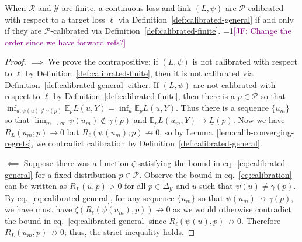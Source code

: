 \documentclass[anon,12pt]{colt2021} %
\newcommand{\Comments}{1}
\newcommand{\mynote}[2]{\ifnum\Comments=1\textcolor{#1}{#2}\fi}
\newcommand{\mytodo}[2]{\ifnum\Comments=1%
	\todo[linecolor=#1!80!black,backgroundcolor=#1,bordercolor=#1!80!black]{#2}\fi}
\newcommand{\jessie}[1]{\mynote{purple}{[JF: #1]}}
\newcommand{\btw}[1]{\mytodo{orange!80!white}{BTW: #1}}
\newcommand{\simplex}{\Delta_\Y}
\newcommand{\E}{\mathbb{E}}
\newcommand{\R}{\mathcal{R}}
\renewcommand{\P}{\mathcal{P}}
\newcommand{\Y}{\mathcal{Y}}
\newcommand{\exploss}[3]{\E_{#3} #1(#2,Y)}
\newcommand{\risk}[1]{\underline{#1}}
\begin{document}
\begin{proposition}
	When $\R$ and $\Y$ are finite, a continuous loss and link $(L, \psi)$ are $\P$-calibrated with respect to a target loss $\ell$ via Definition~\ref{def:calibrated-general} if and only if they are $\P$-calibrated via Definition~\ref{def:calibrated-finite}.
	\jessie{Change the order since we have forward refs?}
\end{proposition}
\begin{proof}
$\implies$
	We prove the contrapositive; if $(L, \psi)$ is not calibrated with respect to $\ell$ by Definition~\ref{def:calibrated-finite}, then it is not calibrated via Definition~\ref{def:calibrated-general} either.
	If $(L, \psi)$ are not calibrated with respect to $\ell$ by Definition~\ref{def:calibrated-finite}, then there is a $p \in \P$ so that $\inf_{u : \psi(u) \not \in \gamma(p)} \exploss{L}{u}{p} = \inf_u \exploss{L}{u}{p}$.
	Thus there is a sequence $\{u_m\}$ so that $\lim_{m \to \infty} \psi(u_m) \not \in \gamma(p)$ and $\exploss{L}{u_m}{p} \to \risk{L}(p)$.  
	Now we have $R_L(u_m; p) \to 0$ but $R_\ell(\psi(u_m); p) \not \to 0$, so by Lemma~\ref{lem:calib-converging-regrets}, we contradict calibration by Definition~\ref{def:calibrated-general}.
%	
%	
%	

$\impliedby$
Suppose there was a function $\zeta$ satisfying the bound in eq.~\eqref{eq:calibrated-general} for a fixed distribution $p \in \P$.
Observe the bound in eq.~\eqref{eq:calibration} can be written as $R_L(u,p) > 0$ for all $p \in \simplex$ and $u$ such that $\psi(u) \neq \gamma(p)$. 
By eq.~\eqref{eq:calibrated-general}, for any sequence $\{u_m\}$ so that $\psi(u_m) \not \to \gamma(p)$, we have must have $\zeta(R_\ell(\psi(u_m), p)) \not \to 0$ as we would otherwise contradict the bound in eq.~\eqref{eq:calibrated-general} since $R_\ell(\psi(u), p) \not \to 0$. 
Therefore $R_L(u_m, p) \not \to 0$; thus, the strict inequality holds.
\end{proof}
\end{document}

